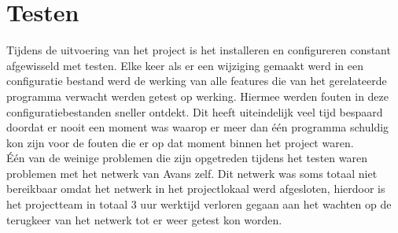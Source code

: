 \documentclass[12pt]{article}
\begin{document}
\section{Testen}
Tijdens de uitvoering van het project is het installeren en configureren constant afgewisseld met testen. Elke keer als er een wijziging gemaakt werd in een configuratie bestand werd de werking van alle features die van het gerelateerde programma verwacht werden getest op werking. Hiermee werden fouten in deze configuratiebestanden sneller ontdekt. Dit heeft uiteindelijk veel tijd bespaard doordat er nooit een moment was waarop er meer dan \'e\'en programma schuldig kon zijn voor de fouten die er op dat moment binnen het project waren.\\
\'E\'en van de weinige problemen die zijn opgetreden tijdens het testen waren problemen met het netwerk van Avans zelf. Dit netwerk was soms totaal niet bereikbaar omdat het netwerk in het projectlokaal werd afgesloten, hierdoor is het projectteam in totaal 3 uur werktijd verloren gegaan aan het wachten op de terugkeer van het netwerk tot er weer getest kon worden.
\end{document}

